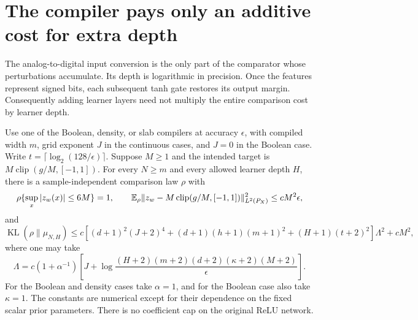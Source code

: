 \section{The compiler pays only an additive cost for extra depth}
\label{sec:stable-compiler-resources}
The analog-to-digital input conversion is the only part of the comparator
whose perturbations accumulate.  Its depth is logarithmic in precision.
Once the features represent signed bits, each subsequent tanh gate
restores its output margin.  Consequently adding learner layers need not
multiply the entire comparison cost by learner depth.

\begin{lemma}\label{lem:stable-compiler-resource}
Use one of the Boolean, density, or slab compilers at accuracy $\epsilon$,
with compiled width $m$, grid exponent $J$ in the continuous cases, and
$J=0$ in the Boolean case.  Write
$t=\lceil\log_2(128/\epsilon)\rceil$.
Suppose $M\ge1$ and the intended target is
$M\operatorname{clip}(g/M,[-1,1])$.
For every $N\ge m$ and every allowed learner depth $H$, there is a
sample-independent comparison law $\rho$ with
\[
 \rho\{\sup_x|z_w(x)|\le6M\}=1,\qquad
 \mathbb E_\rho\|z_w-M\operatorname{clip}(g/M,[-1,1])\|_{L^2(P_X)}^2
                 \le cM^2\epsilon,
\]
and
\begin{equation}\label{eq:stable-compiler-KL}
 \operatorname{KL}(\rho\|\mu_{N,H})\le
 c\left[(d+1)^2(J+2)^4+(d+1)(h+1)(m+1)^2
                  +(H+1)(t+2)^2\right]\Lambda^2+cM^2,
\end{equation}
where one may take
\[
 \Lambda=c(1+\alpha^{-1})\left[J+
 \log\frac{(H+2)(m+2)(d+2)(\kappa+2)(M+2)}{\epsilon}\right].
\]
For the Boolean and density cases take $\alpha=1$, and for the Boolean
case also take $\kappa=1$.  The constants are numerical except for their
dependence on the fixed scalar prior parameters.  There is no coefficient
cap on the original ReLU network.
\end{lemma}
